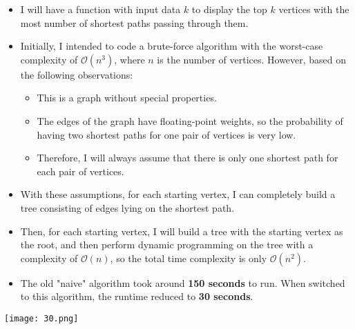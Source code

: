 \documentclass[12pt]{scrartcl}
\begin{document}
\begin{itemize}
\item I will have a function with input data $k$ to display the top $k$ vertices with the most number of shortest paths passing through them.
\item Initially, I intended to code a brute-force algorithm with the worst-case complexity of $\mathcal{O}{(n^3)}$, where $n$ is the number of vertices. However, based on the following observations:
\begin{itemize}
\item This is a graph without special properties.
\item The edges of the graph have floating-point weights, so the probability of having two shortest paths for one pair of vertices is very low.
\item Therefore, I will always assume that there is only one shortest path for each pair of vertices.
\end{itemize}
\item With these assumptions, for each starting vertex, I can completely build a tree consisting of edges lying on the shortest path.
\item Then, for each starting vertex, I will build a tree with the starting vertex as the root, and then perform dynamic programming on the tree with a complexity of $\mathcal{O}{(n)}$, so the total time complexity is only $\mathcal{O}{(n^2)}$.
\item The old "naive" algorithm took around \textbf{150 seconds} to run. When switched to this algorithm, the runtime reduced to \textbf{30 seconds}.
\end{itemize}
\begin{center}
\texttt{[image: 30.png]}
\end{center}
\end{document}
